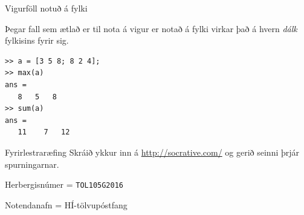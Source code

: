 \documentclass[handout]{beamer}
\begin{document}
\begin{frame}[fragile]{Vigurföll notuð á fylki}

Þegar fall sem ætlað er til nota á vigur er notað á fylki virkar það á hvern \emph{dálk} fylkisins fyrir sig.

\begin{verbatim}
>> a = [3 5 8; 8 2 4];
>> max(a)
ans =
   8   5   8
>> sum(a)
ans =
   11    7   12
\end{verbatim}
\end{frame}

\begin{frame}{Fyrirlestraræfing}
Skráið ykkur inn á \url{http://socrative.com/} og gerið seinni þrjár spurningarnar.

Herbergisnúmer = \texttt{TOL105G2016}

Notendanafn = HÍ-tölvupóstfang
\end{frame}
\end{document}
